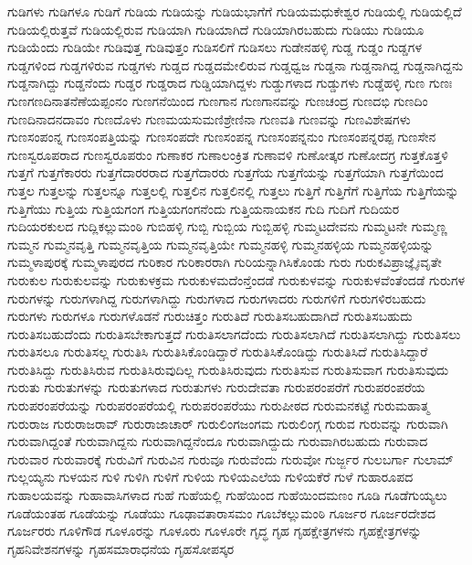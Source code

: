 {ಗುಡಿಗಳು
ಗುಡಿಗಳೂ
ಗುಡಿಗೆ
ಗುಡಿಯ
ಗುಡಿಯನ್ನು
ಗುಡಿಯಭಾಗೆಗೆ
ಗುಡಿಯಮಧುಕೇಶ್ವರ
ಗುಡಿಯಲ್ಲಿ
ಗುಡಿಯಲ್ಲಿದೆ
ಗುಡಿಯಲ್ಲಿರುತ್ತವೆ
ಗುಡಿಯಲ್ಲಿರುವ
ಗುಡಿಯಾಗಿ
ಗುಡಿಯಾಗಿದೆ
ಗುಡಿಯಾಗಿರಬಹುದು
ಗುಡಿಯು
ಗುಡಿಯೂ
ಗುಡಿಯೆಂದು
ಗುಡಿಯೇ
ಗುಡಿವುತ್ತ
ಗುಡಿವುತ್ತಂ
ಗುಡಿಸಲಿಗೆ
ಗುಡಿಸಲು
ಗುಡೇನಹಳ್ಳಿ
ಗುಡ್ಡ
ಗುಡ್ಡಂ
ಗುಡ್ಡಗಳ
ಗುಡ್ಡಗಳಿಂದ
ಗುಡ್ಡಗಳಿರುವ
ಗುಡ್ಡಗಳು
ಗುಡ್ಡದ
ಗುಡ್ಡದಮೇಲಿರುವ
ಗುಡ್ಡಧ್ವಜ
ಗುಡ್ಡನಾ
ಗುಡ್ಡನಾಗಿದ್ದ
ಗುಡ್ಡನಾಗಿದ್ದನು
ಗುಡ್ಡನಾಗಿದ್ದು
ಗುಡ್ಡನೆಂದು
ಗುಡ್ಡರ
ಗುಡ್ಡರಾದ
ಗುಡ್ಡಿಯಾಗಿದ್ದಳು
ಗುಡ್ಡುಗಳಾದ
ಗುಡ್ಡುಗಳು
ಗುಡ್ಡೆಹಳ್ಳಿ
ಗುಣ
ಗುಣಃ
ಗುಣಗಣದಿನಾತನೆಣೆಯಪ್ಪಂನಂ
ಗುಣಗನೆಯಿಂದ
ಗುಣಗಾನ
ಗುಣಗಾನವನ್ನು
ಗುಣಚಂದ್ರ
ಗುಣದಭಿ
ಗುಣದಿಂ
ಗುಣದಿನಾದನದಾವಂ
ಗುಣದೊಳು
ಗುಣಮಯಸುಮಣಿಶ್ರೇಣಿನಾ
ಗುಣವತಿ
ಗುಣವನ್ನು
ಗುಣವಿಶೇಷಗಳು
ಗುಣಸಂಪಂನ್ನ
ಗುಣಸಂಪತ್ತಿಯನ್ನು
ಗುಣಸಂಪದೇ
ಗುಣಸಂಪನ್ನ
ಗುಣಸಂಪನ್ನನುಂ
ಗುಣಸಂಪನ್ನರಪ್ಪ
ಗುಣಸೇನ
ಗುಣಸ್ವರೂಪರಾದ
ಗುಣಸ್ವರೂಪರುಂ
ಗುಣಾಕರ
ಗುಣಾಲಂಕ್ರಿತ
ಗುಣಾವಳಿ
ಗುಣೋತ್ಕರ
ಗುಣೋದಗ್ರ
ಗುತ್ತಕೊತ್ತಳಿ
ಗುತ್ತಗೆ
ಗುತ್ತಗೆಕಾರರು
ಗುತ್ತಗೆದಾರರರಾದ
ಗುತ್ತಗೆದಾರರು
ಗುತ್ತಗೆಯ
ಗುತ್ತಗೆಯನ್ನು
ಗುತ್ತಗೆಯಾಗಿ
ಗುತ್ತಗೆಯಿಂದ
ಗುತ್ತಲ
ಗುತ್ತಲನ್ನು
ಗುತ್ತಲನ್ನೂ
ಗುತ್ತಲಲ್ಲಿ
ಗುತ್ತಲಿನ
ಗುತ್ತಲಿನಲ್ಲಿ
ಗುತ್ತಲು
ಗುತ್ತಿಗೆ
ಗುತ್ತಿಗೆಗೆ
ಗುತ್ತಿಗೆಯ
ಗುತ್ತಿಗೆಯನ್ನು
ಗುತ್ತಿಗೆಯು
ಗುತ್ತಿಯ
ಗುತ್ತಿಯಗಂಗ
ಗುತ್ತಿಯಗಂಗನೆಂದು
ಗುತ್ತಿಯನಾಯಕನ
ಗುದಿ
ಗುದಿಗೆ
ಗುದಿಯರ
ಗುದಿಯರಕುಲದ
ಗುದ್ಲಿಕಲ್ಲುಮಂಠಿ
ಗುಬಿಹಳ್ಳಿ
ಗುಬ್ಬಿ
ಗುಬ್ಬಿಯ
ಗುಬ್ಬಿಹಳ್ಳಿ
ಗುಮ್ಮಟದೇವನು
ಗುಮ್ಮಟನೇ
ಗುಮ್ಮಣ್ಣ
ಗುಮ್ಮನ
ಗುಮ್ಮನವೃತ್ತಿ
ಗುಮ್ಮನವೃತ್ತಿಯ
ಗುಮ್ಮನವೃತ್ತಿಯೇ
ಗುಮ್ಮನಹಳ್ಳಿ
ಗುಮ್ಮನಹಳ್ಳಿಯ
ಗುಮ್ಮನಹಳ್ಳಿಯನ್ನು
ಗುಮ್ಮಳಾಪುರಕ್ಕೆ
ಗುಮ್ಮಳಾಪುರದ
ಗುರಿಕಾರ
ಗುರಿಕಾರರಾಗಿ
ಗುರಿಯನ್ನಾಗಿಸಿಕೊಂಡು
ಗುರು
ಗುರುಕವಿಪ್ರಾಜ್ಞೈಃವೃತೇ
ಗುರುಕುಲ
ಗುರುಕುಲವನ್ನು
ಗುರುಕುಳಕ್ರಮ
ಗುರುಕುಳಮದೆಂನ್ತೆಂದಡೆ
ಗುರುಕುಳವನ್ನು
ಗುರುಕುಳವೆಂತೆಂದಡೆ
ಗುರುಗಳ
ಗುರುಗಳನ್ನು
ಗುರುಗಳಾಗಿದ್ದ
ಗುರುಗಳಾಗಿದ್ದು
ಗುರುಗಳಾದ
ಗುರುಗಳಾದರು
ಗುರುಗಳಿಗೆ
ಗುರುಗಳಿರಬಹುದು
ಗುರುಗಳು
ಗುರುಗಳೂ
ಗುರುಗಳೊಡನೆ
ಗುರುಚಿತ್ತಂ
ಗುರುತಿದೆ
ಗುರುತಿಸಬಹುದಾಗಿದೆ
ಗುರುತಿಸಬಹುದು
ಗುರುತಿಸಬಹುದೆಂದು
ಗುರುತಿಸಬೇಕಾಗುತ್ತದೆ
ಗುರುತಿಸಲಾಗದೆಂದು
ಗುರುತಿಸಲಾಗಿದೆ
ಗುರುತಿಸಲಾಗಿದ್ದು
ಗುರುತಿಸಲು
ಗುರುತಿಸಲೂ
ಗುರುತಿಸಲ್ಲ
ಗುರುತಿಸಿ
ಗುರುತಿಸಿಕೊಂಡಿದ್ದಾರೆ
ಗುರುತಿಸಿಕೊಂಡಿದ್ದು
ಗುರುತಿಸಿದೆ
ಗುರುತಿಸಿದ್ದಾರೆ
ಗುರುತಿಸಿದ್ದು
ಗುರುತಿಸಿರುವ
ಗುರುತಿಸಿರುವುದಿಲ್ಲ
ಗುರುತಿಸಿರುವುದು
ಗುರುತಿಸುವ
ಗುರುತಿಸುವಾಗ
ಗುರುತಿಸುವುದು
ಗುರುತು
ಗುರುತುಗಳನ್ನು
ಗುರುತುಗಳಾದ
ಗುರುತುಗಳು
ಗುರುದೇವತಾ
ಗುರುಪರಂಪರೆಗೆ
ಗುರುಪರಂಪರೆಯ
ಗುರುಪರಂಪರೆಯನ್ನು
ಗುರುಪರಂಪರೆಯಲ್ಲಿ
ಗುರುಪರಂಪರೆಯು
ಗುರುಪೀಠದ
ಗುರುಮನಕಟ್ಟೆ
ಗುರುಮಹಾತ್ಮ
ಗುರುರಾಜ
ಗುರುರಾಜರಾವ್
ಗುರುರಾಜಾಚಾರ್
ಗುರುಲಿಂಗಜಂಗಮ
ಗುರುಲಿಂಗ್ಗ
ಗುರುವ
ಗುರುವನ್ನು
ಗುರುವಾಗಿ
ಗುರುವಾಗಿದ್ದಂತೆ
ಗುರುವಾಗಿದ್ದನು
ಗುರುವಾಗಿದ್ದನೆಂದೂ
ಗುರುವಾಗಿದ್ದುದು
ಗುರುವಾಗಿರಬಹುದು
ಗುರುವಾದ
ಗುರುವಾರ
ಗುರುವಾರಕ್ಕೆ
ಗುರುವಿಗೆ
ಗುರುವಿನ
ಗುರುವೂ
ಗುರುವೆಂದು
ಗುರುವೋ
ಗುರ್ಜ್ಜರ
ಗುಲಬರ್ಗಾ
ಗುಲಾಮ್
ಗುಲ್ಲಯ್ಯನು
ಗುಳಯನ
ಗುಳಿ
ಗುಳಿಗಿ
ಗುಳಿಗೆ
ಗುಳಿಯ
ಗುಳಿಯಎಲೆಯ
ಗುಳಿಯಕೆರೆ
ಗುಳೆ
ಗುಹಾರೂಪದ
ಗುಹಾಲಯವನ್ನು
ಗುಹಾವಾಸಿಗಳಾದ
ಗುಹೆ
ಗುಹೆಯಲ್ಲಿ
ಗುಹೆಯಿಂದ
ಗುಹೆಯಿಂದಮಣಂ
ಗೂಡಿ
ಗೂಡೆಗುಯ್ಯಲು
ಗೂಡೆಯಂತಹ
ಗೂಡೆಯನ್ನು
ಗೂಡೆಯು
ಗೂಢಾವತಾರಾಸಮಂ
ಗೂಬೆಕಲ್ಲುಮಂಠಿ
ಗೂರ್ಜರ
ಗೂರ್ಜರದೇಶದ
ಗೂರ್ಜರರು
ಗೂಳಿಗೌಡ
ಗೂಳೂರನ್ನು
ಗೂಳೂರು
ಗೂಳೂರೇ
ಗೃದ್ಧ
ಗೃಹ
ಗೃಹಕ್ಷೇತ್ರಗಳನು
ಗೃಹಕ್ಷೇತ್ರಗಳನ್ನು
ಗೃಹನಿವೇಶನಗಳನ್ನು
ಗೃಹಸಮಾರಾಧನೆಯ
ಗೃಹಸೋಪಸ್ಕರ
}
